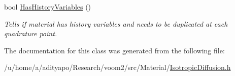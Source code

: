 \begin{DoxyCompactItemize}
\item 
\hypertarget{classvoom_1_1_isotropic_diffusion_a47882d918cb9079d91d670cbbbca5fab}{
bool \hyperlink{classvoom_1_1_isotropic_diffusion_a47882d918cb9079d91d670cbbbca5fab}{HasHistoryVariables} ()}
\label{classvoom_1_1_isotropic_diffusion_a47882d918cb9079d91d670cbbbca5fab}

\begin{DoxyCompactList}\small\item\em Tells if material has history variables and needs to be duplicated at each quadrature point. \item\end{DoxyCompactList}\end{DoxyCompactItemize}


The documentation for this class was generated from the following file:\begin{DoxyCompactItemize}
\item 
/u/home/a/adityapo/Research/voom2/src/Material/\hyperlink{_isotropic_diffusion_8h}{IsotropicDiffusion.h}\end{DoxyCompactItemize}
